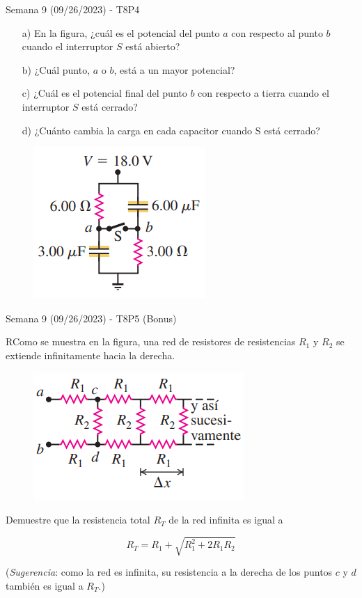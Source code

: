 \begin{frame}{Semana 9 (09/26/2023) - T8P4}

    \begin{itemize}
        \item[a)] En la figura, ¿cuál es el potencial del punto $a$ con respecto al punto $b$
cuando el interruptor $S$ está abierto?
        \item[b)] ¿Cuál punto, $a$ o $b$, está a un mayor
potencial?
        \item[c)] ¿Cuál es el potencial final
del punto $b$ con respecto a tierra cuando
el interruptor $S$ está cerrado?
        \item[d)] ¿Cuánto cambia la carga en cada capacitor
cuando S está cerrado?
    \end{itemize}

    \begin{figure}
    \centering
    \includegraphics[scale=0.6]{figures/t8p42302.png}
    \end{figure}

    
\end{frame}

\begin{frame}{Semana 9 (09/26/2023) - T8P5 (Bonus)}
    
    RComo se muestra en la figura, una red de resistores de resistencias $R_1$ y $R_2$ se extiende infinitamente hacia la derecha.
    
    \begin{figure}
    \centering
    \includegraphics[scale=0.6]{figures/t7p5.png}
    \end{figure}
    
    Demuestre que la resistencia total $R_T$ de la red infinita es igual a

    \begin{equation}
        R_T=R_1+\sqrt{R_1^2+2R_1R_2}
    \end{equation}
    
    (\textit{Sugerencia}: como la red es infinita, su resistencia a la derecha de los puntos $c$ y $d$ también es igual a $R_T$.)
    
\end{frame}

